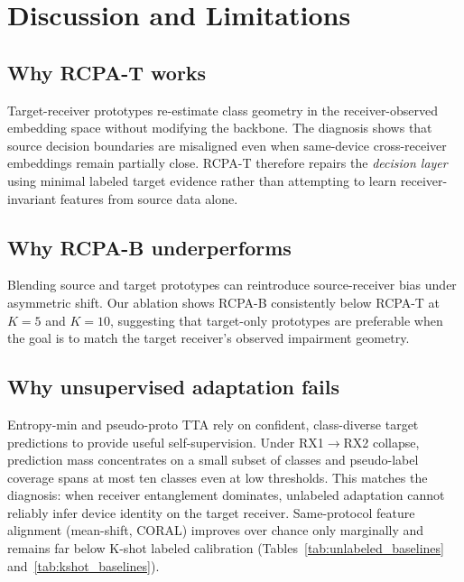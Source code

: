 \section{Discussion and Limitations}
\label{sec:discussion}

\subsection{Why RCPA-T works}
Target-receiver prototypes re-estimate class geometry in the receiver-observed embedding space without modifying the backbone.
The diagnosis shows that source decision boundaries are misaligned even when same-device cross-receiver embeddings remain partially close.
RCPA-T therefore repairs the \emph{decision layer} using minimal labeled target evidence rather than attempting to learn receiver-invariant features from source data alone.

\subsection{Why RCPA-B underperforms}
Blending source and target prototypes can reintroduce source-receiver bias under asymmetric shift.
Our ablation shows RCPA-B consistently below RCPA-T at $K{=}5$ and $K{=}10$, suggesting that target-only prototypes are preferable when the goal is to match the target receiver's observed impairment geometry.

\subsection{Why unsupervised adaptation fails}
Entropy-min and pseudo-proto TTA rely on confident, class-diverse target predictions to provide useful self-supervision.
Under RX1$\rightarrow$RX2 collapse, prediction mass concentrates on a small subset of classes and pseudo-label coverage spans at most ten classes even at low thresholds.
This matches the diagnosis: when receiver entanglement dominates, unlabeled adaptation cannot reliably infer device identity on the target receiver.
Same-protocol feature alignment (mean-shift, CORAL) improves over chance only marginally and remains far below K-shot labeled calibration (Tables~\ref{tab:unlabeled_baselines} and~\ref{tab:kshot_baselines}).

